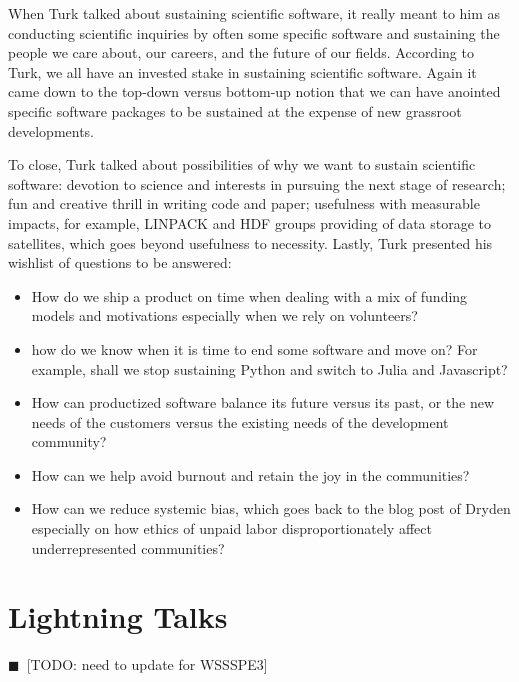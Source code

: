 \documentclass[11pt, oneside]{amsart}
\newcommand{\todo}[1]{{\color{blue}$\blacksquare$~\textsf{[TODO: #1]}}}
\newcommand{\note}[1]{ {\textcolor{blueish}    { ***Note:      #1 }}}
\begin{document}
When Turk talked about sustaining scientific software, it really meant to him as
conducting scientific inquiries by often some specific software and sustaining
the people we care about, our careers, and the future of our fields. According
to Turk, we all have an invested stake in sustaining scientific software. Again
it came down to the top-down versus bottom-up notion that we can have anointed
specific software packages to be sustained at the expense of new grassroot
developments.

To close, Turk talked about possibilities of why we want to sustain scientific
software: devotion to science and interests in pursuing the next stage of
research; fun and creative thrill in writing code and paper; usefulness with
measurable impacts, for example, LINPACK and HDF groups providing of data
storage to satellites, which goes beyond usefulness to necessity. Lastly, Turk
presented his wishlist of questions to be answered: 
%
\begin{itemize} 

\item How do we ship a product on time when dealing with a mix of funding models
and motivations especially when we rely on volunteers?

\item how do we know when it is time to end some software and move on? For
example, shall we stop sustaining Python and switch to Julia and Javascript?
 
\item How can productized software balance its future versus its past, or the new
needs of the customers versus the existing needs of the development community?

\item How can we help avoid burnout and retain the joy in the communities?

\item How can we reduce systemic bias, which goes back to the blog post of
Dryden especially on how ethics of unpaid labor disproportionately affect
underrepresented communities?

\end{itemize}

\section{Lightning Talks} \label{sec:lightning}
\todo{need to update for WSSSPE3}
\begin{comment}
\note{
\href{http://wssspe.researchcomputing.org.uk/wssspe3/agenda/}{Slides.}}
\end{comment}
\end{document}

